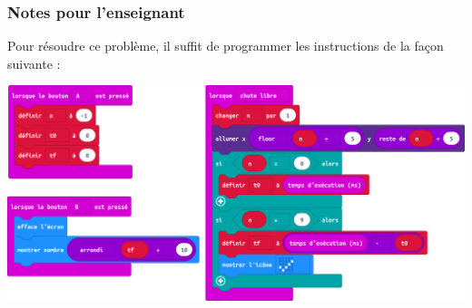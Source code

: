 \newpage
\subsubsection{Notes pour l'enseignant}



\begin{methode}
Pour résoudre ce problème, il suffit de programmer les instructions de la façon suivante :

\begin{center}
    \includegraphics[width=0.95\linewidth]{res/mbChutesN2proposition.png}    
\end{center}

\end{methode}
